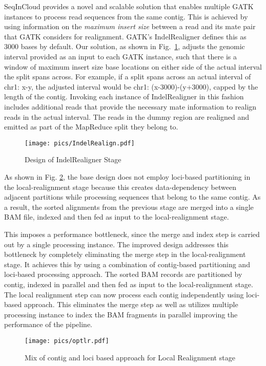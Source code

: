 SeqInCloud provides a novel and scalable solution that enables multiple GATK instances to process read sequences from the same contig. This is achieved by using information on the \textit{maximum insert size} between a read and its mate pair that GATK considers for realignment. GATK's IndelRealigner defines this as 3000 bases by default. Our solution, as shown in Fig.~\ref{fig:indel}, adjusts the genomic interval provided as an input to each GATK instance, such that there is a window of maximum insert size base locations on either side of the actual interval the split spans across. For example, if a split spans across an actual interval of chr1: x-y, the adjusted interval would be chr1: (x-3000)-(y+3000), capped by the length of the contig. Invoking each instance of IndelRealigner in this fashion includes additional reads that provide the necessary mate information to realign reads in the actual interval. The reads in the dummy region are realigned and emitted as part of the MapReduce split they belong to. 

\begin{figure}[!htb]
  \centering
  \texttt{[image: pics/IndelRealign.pdf]}
  \caption{Design of IndelRealigner Stage}
  \label{fig:indel}
\end{figure}

As shown in Fig. \ref{fig:optlr}, the base design does not employ loci-based partitioning in the local-realignment stage because this creates data-dependency between adjacent partitions while processing sequences that belong to the same contig. As a result, the sorted alignments from the previous stage are merged into a single BAM file, indexed and then fed as input to the local-realignment stage.

This imposes a performance bottleneck, since the merge and index step is carried out by a single processing instance. The improved design addresses this bottleneck by completely eliminating the merge step in the local-realignment stage. It achieves this by using a combination of contig-based partitioning and loci-based processing approach. The sorted BAM records are partitioned by contig, indexed in parallel and then fed as input to the local-realignment stage. The local realignment step can now process each contig independently using loci-based approach. This eliminates the merge step as well as utilizes multiple processing instance to index the BAM fragments in parallel improving the performance of the pipeline.

\begin{figure}[!tpb]
  \centering
  \texttt{[image: pics/optlr.pdf]}
  \caption{Mix of contig and loci based approach for Local Realignment stage}
  \label{fig:optlr}
\end{figure}

